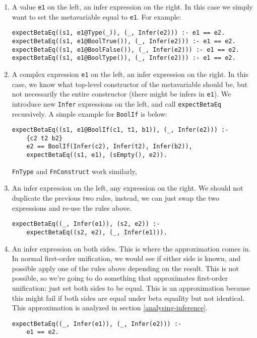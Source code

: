 \begin{enumerate}
	\item A value \verb|e1| on the left, an infer expression on the right. In this case we simply want to set the metavariable equal to \verb|e1|. For example:
	\begin{lstlisting}
expectBetaEq((s1, e1@Type(_)), (_, Infer(e2))) :- e1 == e2.
expectBetaEq((s1, e1@BoolTrue()), (_, Infer(e2))) :- e1 == e2.
expectBetaEq((s1, e1@BoolFalse()), (_, Infer(e2))) :- e1 == e2.
expectBetaEq((s1, e1@BoolType()), (_, Infer(e2))) :- e1 == e2.
	\end{lstlisting}

	\item A complex expression \verb|e1| on the left, an infer expression on the right. In this case, we know what top-level constructor of the metavariable should be, but not necessarily the entire constructor (there might be infers in \verb|e1|). We introduce new \verb|Infer| expressions on the left, and call \verb|expectBetaEq| recursively. A simple example for \verb|BoolIf| is below:
	\begin{lstlisting}
expectBetaEq((s1, e1@BoolIf(c1, t1, b1)), (_, Infer(e2))) :-
	{c2 t2 b2}
	e2 == BoolIf(Infer(c2), Infer(t2), Infer(b2)),
	expectBetaEq((s1, e1), (sEmpty(), e2)).
	\end{lstlisting}
	\verb|FnType| and \verb|FnConstruct| work similarly, 
	
	\item An infer expression on the left, any expression on the right. We should not duplicate the previous two rules, instead, we can just swap the two expressions and re-use the rules above.
\begin{lstlisting}
expectBetaEq((_, Infer(e1)), (s2, e2)) :-
	expectBetaEq((s2, e2), (_, Infer(e1))).
\end{lstlisting}

	\item \label{inf-case4} An infer expression on both sides. This is where the approximation comes in. In normal first-order unification, we would see if either side is known, and possible apply one of the rules above depending on the result. This is not possible, so we're going to do something that approximates first-order unification: just set both sides to be equal. This is an approximation because this might fail if both sides are equal under beta equality but not identical. This approximation is analyzed in section \ref{analysing-inference}.
\begin{lstlisting}
expectBetaEq((_, Infer(e1)), (_, Infer(e2))) :-
	e1 == e2.
\end{lstlisting}
	
\end{enumerate}

